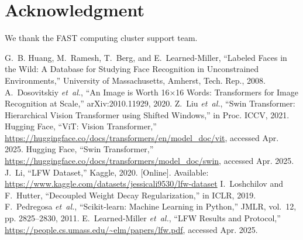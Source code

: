 \documentclass[twocolumn]{IEEEtran}
\begin{document}
\section*{Acknowledgment}
We thank the FAST computing cluster support team.


\begin{thebibliography}{10}
 G.~B. Huang, M.~Ramesh, T.~Berg, and E.~Learned-Miller, “Labeled Faces in the Wild: A Database for Studying Face Recognition in Unconstrained Environments,” University of Massachusetts, Amherst, Tech. Rep., 2008.
 A.~Dosovitskiy \emph{et~al.}, “An Image is Worth 16×16 Words: Transformers for Image Recognition at Scale,” arXiv:2010.11929, 2020.
 Z.~Liu \emph{et~al.}, “Swin Transformer: Hierarchical Vision Transformer using Shifted Windows,” in Proc. ICCV, 2021.
 Hugging Face, “ViT: Vision Transformer,” \url{https://huggingface.co/docs/transformers/en/model_doc/vit}, accessed Apr. 2025.
 Hugging Face, “Swin Transformer,” \url{https://huggingface.co/docs/transformers/model_doc/swin}, accessed Apr. 2025.
 J.~Li, “LFW Dataset,” Kaggle, 2020. [Online]. Available: \url{https://www.kaggle.com/datasets/jessicali9530/lfw-dataset}
 I.~Loshchilov and F.~Hutter, “Decoupled Weight Decay Regularization,” in ICLR, 2019.
 F.~Pedregosa \emph{et~al.}, “Scikit-learn: Machine Learning in Python,” JMLR, vol.~12, pp. 2825–2830, 2011.
 E.~Learned-Miller \emph{et~al.}, “LFW Results and Protocol,” \url{https://people.cs.umass.edu/~elm/papers/lfw.pdf}, accessed Apr. 2025.
\end{thebibliography}
\end{document}

